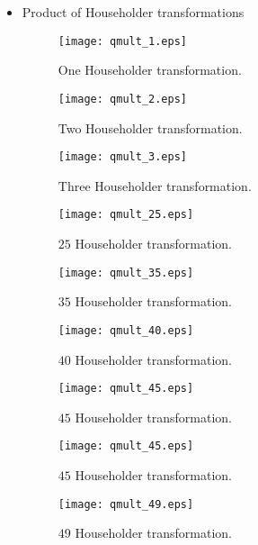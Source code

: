 \documentclass[a4paper]{article}
\begin{document}
\begin{itemize}

\item Product of Householder transformations

\begin{figure}[!htb]
\centering
\texttt{[image: qmult\_1.eps]}
\caption{One Householder transformation.}
\label{fig:1}
\end{figure}

\begin{figure}[!htb]
\centering
\texttt{[image: qmult\_2.eps]}
\caption{Two Householder transformation.}
\label{fig:2}
\end{figure}

\begin{figure}[!htb]
\centering
\texttt{[image: qmult\_3.eps]}
\caption{Three Householder transformation.}
\label{fig:3}
\end{figure}

\begin{figure}[!htb]
\centering
\texttt{[image: qmult\_25.eps]}
\caption{$25$ Householder transformation.}
\label{fig:25}
\end{figure}

\begin{figure}[!htb]
\centering
\texttt{[image: qmult\_35.eps]}
\caption{$35$ Householder transformation.}
\label{fig:35}
\end{figure}

\begin{figure}[!htb]
\centering
\texttt{[image: qmult\_40.eps]}
\caption{$40$ Householder transformation.}
\label{fig:40}
\end{figure}

\begin{figure}[!htb]
\centering
\texttt{[image: qmult\_45.eps]}
\caption{$45$ Householder transformation.}
\label{fig:45}
\end{figure}

\begin{figure}[!htb]
\centering
\texttt{[image: qmult\_45.eps]}
\caption{$45$ Householder transformation.}
\label{fig:45}
\end{figure}

\begin{figure}[!htb]
\centering
\texttt{[image: qmult\_49.eps]}
\caption{$49$ Householder transformation.}
\label{fig:49}
\end{figure}


\end{itemize}
\end{document}

